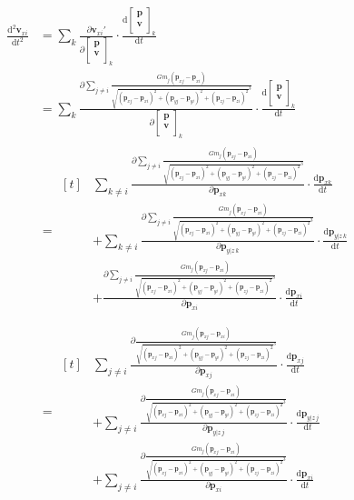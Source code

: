 \documentclass[12pt,letterpaper]{article}
\newcommand{\vep}{\bm{p}}
\newcommand{\vev}{\bm{v}}
\newcommand{\der}[2]{\frac{\text{d} #1}{\text{d} #2}}
\newcommand{\ders}[2]{\frac{\text{d}^2 #1}{{\text{d} #2}^2}}
\newcommand{\pard}[2]{\frac{\partial #1}{\partial #2}}
\begin{document}
    \begin{align*}
        \ders{\vev_{xi}}{t}
        &=\sum_{k}\pard{\vev_{xi}'}{\left[\begin{matrix}\vep\\\vev\\\end{matrix}\right]_k} \cdot \der{\left[\begin{matrix}\vep\\\vev\\\end{matrix}\right]_k}{t}\\
        &=\sum_{k}\pard{\sum_{j\neq i}\frac{Gm_j(\vep_{xj}-\vep_{xi})}{\sqrt{(\vep_{xj}-\vep_{xi})^2+(\vep_{yj}-\vep_{yi})^2+(\vep_{zj}-\vep_{zi})^2}^3}}{\left[\begin{matrix}\vep\\\vev\\\end{matrix}\right]_k} \cdot \der{\left[\begin{matrix}\vep\\\vev\\\end{matrix}\right]_k}{t}\\
        &=\begin{aligned}[t]
            &\sum_{k\neq i}\pard{\sum_{j\neq i}\frac{Gm_j(\vep_{xj}-\vep_{xi})}{\sqrt{(\vep_{xj}-\vep_{xi})^2+(\vep_{yj}-\vep_{yi})^2+(\vep_{zj}-\vep_{zi})^2}^3}}{\vep_{xk}} \cdot \der{\vep_{xk}}{t}\\
            &+\sum_{k\neq i}\pard{\sum_{j\neq i}\frac{Gm_j(\vep_{xj}-\vep_{xi})}{\sqrt{(\vep_{xj}-\vep_{xi})^2+(\vep_{yj}-\vep_{yi})^2+(\vep_{zj}-\vep_{zi})^2}^3}}{\vep_{y|z\,k}} \cdot \der{\vep_{y|z\,k}}{t}\\
            &+\pard{\sum_{j\neq i}\frac{Gm_j(\vep_{xj}-\vep_{xi})}{\sqrt{(\vep_{xj}-\vep_{xi})^2+(\vep_{yj}-\vep_{yi})^2+(\vep_{zj}-\vep_{zi})^2}^3}}{\vep_{xi}} \cdot \der{\vep_{xi}}{t}\\
        \end{aligned}\\
        &=\begin{aligned}[t]
            &\sum_{j\neq i}\pard{\frac{Gm_j(\vep_{xj}-\vep_{xi})}{\sqrt{(\vep_{xj}-\vep_{xi})^2+(\vep_{yj}-\vep_{yi})^2+(\vep_{zj}-\vep_{zi})^2}^3}}{\vep_{xj}} \cdot \der{\vep_{xj}}{t}\\
            &+\sum_{j\neq i}\pard{\frac{Gm_j(\vep_{xj}-\vep_{xi})}{\sqrt{(\vep_{xj}-\vep_{xi})^2+(\vep_{yj}-\vep_{yi})^2+(\vep_{zj}-\vep_{zi})^2}^3}}{\vep_{y|z\,j}} \cdot \der{\vep_{y|z\,j}}{t}\\
            &+\sum_{j\neq i}\pard{\frac{Gm_j(\vep_{xj}-\vep_{xi})}{\sqrt{(\vep_{xj}-\vep_{xi})^2+(\vep_{yj}-\vep_{yi})^2+(\vep_{zj}-\vep_{zi})^2}^3}}{\vep_{xi}} \cdot \der{\vep_{xi}}{t}\\
        \end{aligned}\\
    \end{align*}
\end{document}
